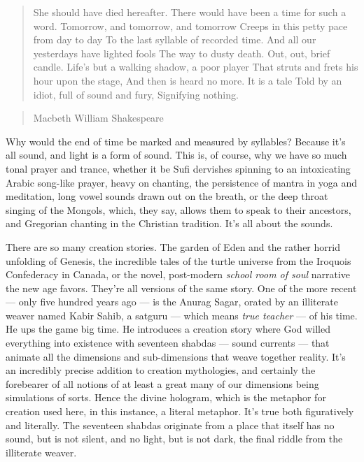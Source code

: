 \begin{quote}
She should have died hereafter. There would have been a time for such a
word. Tomorrow, and tomorrow, and tomorrow Creeps in this petty pace
from day to day To the last syllable of recorded time. And all our
yesterdays have lighted fools The way to dusty death. Out, out, brief
candle. Life's but a walking shadow, a poor player That struts and frets
his hour upon the stage, And then is heard no more. It is a tale Told by
an idiot, full of sound and fury, Signifying nothing.
\end{quote}

\begin{quote}
Macbeth William Shakespeare
\end{quote}

Why would the end of time be marked and measured by syllables? Because
it's all sound, and light is a form of sound. This is, of course, why we
have so much tonal prayer and trance, whether it be Sufi dervishes
spinning to an intoxicating Arabic song-like prayer, heavy on chanting,
the persistence of mantra in yoga and meditation, long vowel sounds
drawn out on the breath, or the deep throat singing of the Mongols,
which, they say, allows them to speak to their ancestors, and Gregorian
chanting in the Christian tradition. It's all about the sounds.

There are so many creation stories. The garden of Eden and the rather
horrid unfolding of Genesis, the incredible tales of the turtle universe
from the Iroquois Confederacy in Canada, or the novel, post-modern
\emph{school room of soul} narrative the new age favors. They're all
versions of the same story. One of the more recent --- only five hundred
years ago --- is the Anurag Sagar, orated by an illiterate weaver named
Kabir Sahib, a satguru --- which means \emph{true teacher} --- of his
time. He ups the game big time. He introduces a creation story where God
willed everything into existence with seventeen shabdas --- sound
currents --- that animate all the dimensions and sub-dimensions that
weave together reality. It's an incredibly precise addition to creation
mythologies, and certainly the forebearer of all notions of at least a
great many of our dimensions being simulations of sorts. Hence the
divine hologram, which is the metaphor for creation used here, in this
instance, a literal metaphor. It's true both figuratively and literally.
The seventeen shabdas originate from a place that itself has no sound,
but is not silent, and no light, but is not dark, the final riddle from
the illiterate weaver.

